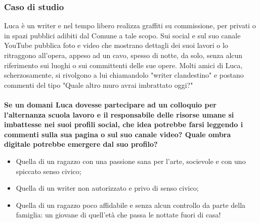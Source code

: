 \documentclass{article}
\begin{document}
	\subsubsection{Caso di studio}
	\label{sec:Caso2}
	Luca è un writer e nel tempo libero realizza graffiti su commissione, per privati o in spazi pubblici adibiti dal Comune a tale scopo. Sui social e sul suo canale YouTube pubblica foto e video che mostrano dettagli dei suoi lavori o lo ritraggono all'opera, appeso ad un cavo, spesso di notte, da solo, senza alcun riferimento sui luoghi o sui committenti delle sue opere. Molti amici di Luca, scherzosamente, si rivolgono a lui chiamandolo "writer clandestino" e postano commenti del tipo "Quale altro muro avrai imbrattato oggi?"
	\\\vspace{5mm}\\
	\textbf{Se un domani Luca dovesse partecipare ad un colloquio per l’alternanza scuola lavoro e il responsabile delle risorse umane si imbattesse nei suoi profili social, che idea potrebbe farsi leggendo i commenti sulla sua pagina o sul suo canale video? Quale ombra digitale potrebbe emergere dal suo profilo?}
	\begin{itemize}
		\item Quella di un ragazzo con una passione sana per l’arte, socievole e con uno spiccato senso civico;
		\item Quella di un writer non autorizzato e privo di senso civico;
		\item Quella di un ragazzo poco affidabile e senza alcun controllo da parte della famiglia: un giovane di quell’età che passa le nottate fuori di casa!
	\end{itemize}
\end{document}
